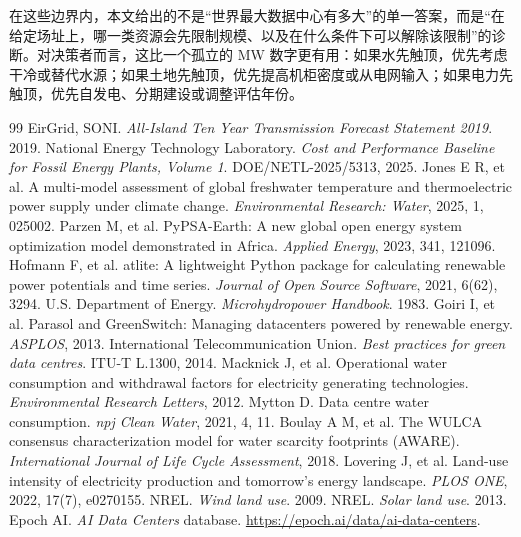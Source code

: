 \documentclass{mcmthesis}
\begin{document}
在这些边界内，本文给出的不是“世界最大数据中心有多大”的单一答案，而是“在给定场址上，哪一类资源会先限制规模、以及在什么条件下可以解除该限制”的诊断。对决策者而言，这比一个孤立的 MW 数字更有用：如果水先触顶，优先考虑干冷或替代水源；如果土地先触顶，优先提高机柜密度或从电网输入；如果电力先触顶，优先自发电、分期建设或调整评估年份。

\begin{thebibliography}{99}
 EirGrid, SONI. \emph{All-Island Ten Year Transmission Forecast Statement 2019}. 2019.
 National Energy Technology Laboratory. \emph{Cost and Performance Baseline for Fossil Energy Plants, Volume 1}. DOE/NETL-2025/5313, 2025.
 Jones E R, et al. A multi-model assessment of global freshwater temperature and thermoelectric power supply under climate change. \emph{Environmental Research: Water}, 2025, 1, 025002.
 Parzen M, et al. PyPSA-Earth: A new global open energy system optimization model demonstrated in Africa. \emph{Applied Energy}, 2023, 341, 121096.
 Hofmann F, et al. atlite: A lightweight Python package for calculating renewable power potentials and time series. \emph{Journal of Open Source Software}, 2021, 6(62), 3294.
 U.S. Department of Energy. \emph{Microhydropower Handbook}. 1983.
 Goiri I, et al. Parasol and GreenSwitch: Managing datacenters powered by renewable energy. \emph{ASPLOS}, 2013.
 International Telecommunication Union. \emph{Best practices for green data centres}. ITU-T L.1300, 2014.
 Macknick J, et al. Operational water consumption and withdrawal factors for electricity generating technologies. \emph{Environmental Research Letters}, 2012.
 Mytton D. Data centre water consumption. \emph{npj Clean Water}, 2021, 4, 11.
 Boulay A M, et al. The WULCA consensus characterization model for water scarcity footprints (AWARE). \emph{International Journal of Life Cycle Assessment}, 2018.
 Lovering J, et al. Land-use intensity of electricity production and tomorrow's energy landscape. \emph{PLOS ONE}, 2022, 17(7), e0270155.
 NREL. \emph{Wind land use}. 2009.
 NREL. \emph{Solar land use}. 2013.
 Epoch AI. \emph{AI Data Centers} database. \url{https://epoch.ai/data/ai-data-centers}.
\end{thebibliography}

\appendix
\end{document}
